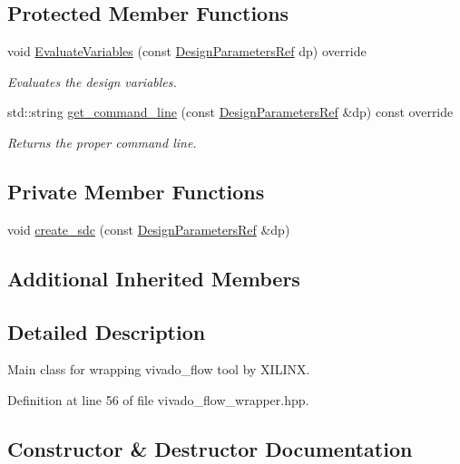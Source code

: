 \subsection*{Protected Member Functions}
\begin{DoxyCompactItemize}
\item 
void \hyperlink{classvivado__flow__wrapper_a53ba0a2d08c3313f7ca81b9679547cc1}{Evaluate\+Variables} (const \hyperlink{DesignParameters_8hpp_ae36bb1c4c9150d0eeecfe1f96f42d157}{Design\+Parameters\+Ref} dp) override
\begin{DoxyCompactList}\small\item\em Evaluates the design variables. \end{DoxyCompactList}\item 
std\+::string \hyperlink{classvivado__flow__wrapper_a26a19ae9d3f2cd1682a06873348f7731}{get\+\_\+command\+\_\+line} (const \hyperlink{DesignParameters_8hpp_ae36bb1c4c9150d0eeecfe1f96f42d157}{Design\+Parameters\+Ref} \&dp) const override
\begin{DoxyCompactList}\small\item\em Returns the proper command line. \end{DoxyCompactList}\end{DoxyCompactItemize}
\subsection*{Private Member Functions}
\begin{DoxyCompactItemize}
\item 
void \hyperlink{classvivado__flow__wrapper_ab5401741a7ebd12993cb8b2115a100c6}{create\+\_\+sdc} (const \hyperlink{DesignParameters_8hpp_ae36bb1c4c9150d0eeecfe1f96f42d157}{Design\+Parameters\+Ref} \&dp)
\end{DoxyCompactItemize}
\subsection*{Additional Inherited Members}


\subsection{Detailed Description}
Main class for wrapping vivado\+\_\+flow tool by X\+I\+L\+I\+NX. 

Definition at line 56 of file vivado\+\_\+flow\+\_\+wrapper.\+hpp.



\subsection{Constructor \& Destructor Documentation}
\mbox{\label{classvivado__flow__wrapper_a8d308491e66f2a4106dd0105acee3804}} 
